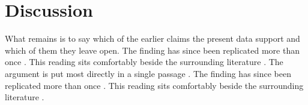 \documentclass{article}
\begin{document}
\section{Discussion}
What remains is to say which of the earlier claims the present data support and which of them they leave open. The finding has since been replicated more than once \parencite{mccarthy1960recursive,minskypapert1969perceptrons}. This reading sits comfortably beside the surrounding literature \parencite{rumelhart1986learning}. The argument is put most directly in a single passage \parencite[p.~14]{hochreiterschmidhuber1997long}. The finding has since been replicated more than once \parencite{goodfellow2014generative,pagebrin1999pagerank}. This reading sits comfortably beside the surrounding literature \parencite{tanenbaum1981computer}.

\printbibliography
\end{document}
